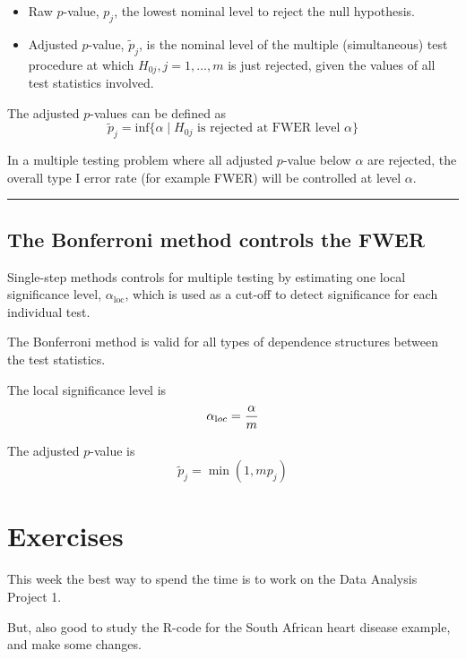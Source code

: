 \documentclass[
  letterpaper,
  DIV=11,
  numbers=noendperiod]{scrartcl}
\providecommand{\tightlist}{%
  \setlength{\itemsep}{0pt}\setlength{\parskip}{0pt}}\usepackage{longtable,booktabs,array}
\begin{document}
\begin{itemize}
\tightlist
\item
  Raw \(p\)-value, \(p_j\), the lowest nominal level to reject the null
  hypothesis.\\
\item
  Adjusted \(p\)-value, \(\tilde{p}_j\), is the nominal level of the
  multiple (simultaneous) test procedure at which
  \(H_{0j}, j=1,\ldots,m\) is just rejected, given the values of all
  test statistics involved.
\end{itemize}

The adjusted \(p\)-values can be defined as
\[\tilde{p}_j = \text{inf}\{\alpha  \mid H_{0j}\text{ is rejected at FWER level } \alpha \}\]

In a multiple testing problem where all adjusted \(p\)-value below
\(\alpha\) are rejected, the overall type I error rate (for example
FWER) will be controlled at level \(\alpha\).

\begin{center}\rule{0.5\linewidth}{0.5pt}\end{center}

\hypertarget{the-bonferroni-method-controls-the-fwer}{%
\subsection{The Bonferroni method controls the
FWER}\label{the-bonferroni-method-controls-the-fwer}}

Single-step methods controls for multiple testing by estimating one
local significance level, \(\alpha_{\text{loc}}\), which is used as a
cut-off to detect significance for each individual test.

The Bonferroni method is valid for all types of dependence structures
between the test statistics.

The local significance level is \[\alpha_{\text loc}=\frac{\alpha}{m}\]

The adjusted \(p\)-value is \[ \tilde{p}_j =\min(1,m p_j)\]

\hypertarget{exercises}{%
\section{Exercises}\label{exercises}}

This week the best way to spend the time is to work on the Data Analysis
Project 1.

But, also good to study the R-code for the South African heart disease
example, and make some changes.
\end{document}
